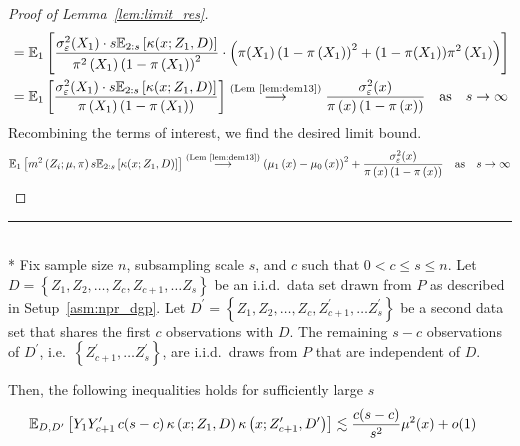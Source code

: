 \begin{proof}[Proof of Lemma~\ref{lem:limit_res}]
\begin{equation}
\begin{aligned}
			 & = \mathbb{E}_{1}\left[\frac{\sigma_{\varepsilon}^2(X_1) \cdot s \mathbb{E}_{2:s}\left[\kappa(x; Z_1, D)\right]}{\pi^2\left(X_1\right)\left(1 - \pi\left(X_1\right)\right)^2} \cdot
			\left(\pi(X_1)\left(1 - \pi\left(X_1\right)\right)^2 + (1 - \pi(X_1))\pi^2\left(X_1\right) \right)\right]                                                             \\
			 & = \mathbb{E}_{1}\left[\frac{\sigma_{\varepsilon}^2(X_1) \cdot s \mathbb{E}_{2:s}\left[\kappa(x; Z_1, D)\right]}{\pi\left(X_1\right)\left(1 - \pi\left(X_1\right)\right)}\right]
			\overset{\text{(Lem~\ref{lem:dem13})}}{\longrightarrow} \frac{\sigma_{\varepsilon}^2(x)}{\pi\left(x\right)\left(1 - \pi\left(x\right)\right)}
			\quad \text{as} \quad s \rightarrow \infty
		\end{aligned}
	\end{equation}
	Recombining the terms of interest, we find the desired limit bound.
	\begin{equation}
		\begin{aligned}
			\mathbb{E}_{1}\left[m^2\left(Z_{i}; \mu, \pi\right) s \mathbb{E}_{2:s}\left[\kappa(x; Z_1, D)\right]\right]
			\overset{\text{(Lem~\ref{lem:dem13})}}{\longrightarrow} \left(\mu_1\left(x\right) - \mu_0\left(x\right)\right)^2 + \frac{\sigma_{\varepsilon}^2(x)}{\pi\left(x\right)\left(1 - \pi\left(x\right)\right)}
			\quad \text{as} \quad s \rightarrow \infty
		\end{aligned}
	\end{equation}
\end{proof}

\hrule

\begin{lem}\label{lem:npr_kern_ineq1}\mbox{}\\*
	Fix sample size $n$, subsampling scale $s$, and $c$ such that $0 < c \leq s \leq n$.
	Let $D = \left\{Z_1, Z_2, \dotsc, Z_c, Z_{c+1}, \dotsc Z_s \right\}$ be an i.i.d.\ data set drawn from $P$ as described in Setup~\ref{asm:npr_dgp}.
	Let $D^{\prime} = \left\{Z_1, Z_2, \dotsc, Z_c, Z_{c+1}^{\prime}, \dotsc Z_s^{\prime} \right\}$ be a second data set that shares the first $c$ observations with $D$.
	The remaining $s - c$ observations of $D^{\prime}$, i.e.\ $\left\{Z_{c+1}^{\prime}, \dotsc Z_s^{\prime} \right\}$, are i.i.d.\ draws from $P$ that are independent of $D$.

	Then, the following inequalities holds for sufficiently large $s$
	\begin{equation}
		\begin{aligned}
			\mathbb{E}_{D, D^{\prime}}\left[Y_{1}Y_{c+1}^{\prime} \, c(s-c) \, \kappa\left(x; Z_{1}, D\right)\kappa\left(x; Z_{c+1}^{\prime}, D^{\prime}\right)\right]
			& \lesssim  \frac{c(s-c)}{s^2}\mu^2(x) + o(1) 	
		\end{aligned}
	\end{equation}
\end{lem}

